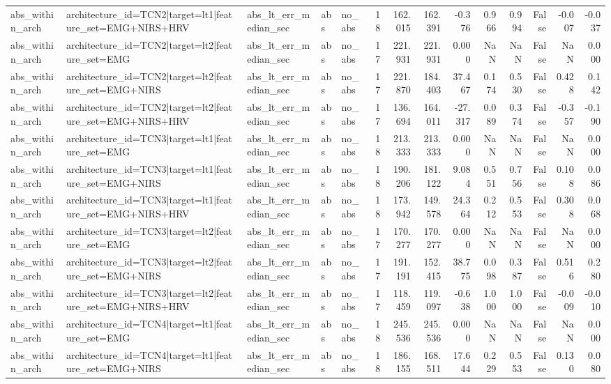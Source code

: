 \begin{table}
\begin{tabular}{lllllrrrrrrrrr}
abs_within_arch & architecture_id=TCN2|target=lt1|feature_set=EMG+NIRS+HRV & abs_lt_err_median_sec & abs & no_abs & 18 & 162.015 & 162.391 & -0.376 & 0.966 & 0.994 & False & -0.007 & -0.037 \\
abs_within_arch & architecture_id=TCN2|target=lt2|feature_set=EMG & abs_lt_err_median_sec & abs & no_abs & 17 & 221.931 & 221.931 & 0.000 & NaN & NaN & False & NaN & 0.000 \\
abs_within_arch & architecture_id=TCN2|target=lt2|feature_set=EMG+NIRS & abs_lt_err_median_sec & abs & no_abs & 17 & 221.870 & 184.403 & 37.467 & 0.174 & 0.530 & False & 0.428 & 0.142 \\
abs_within_arch & architecture_id=TCN2|target=lt2|feature_set=EMG+NIRS+HRV & abs_lt_err_median_sec & abs & no_abs & 17 & 136.694 & 164.011 & -27.317 & 0.089 & 0.374 & False & -0.357 & -0.190 \\
abs_within_arch & architecture_id=TCN3|target=lt1|feature_set=EMG & abs_lt_err_median_sec & abs & no_abs & 18 & 213.333 & 213.333 & 0.000 & NaN & NaN & False & NaN & 0.000 \\
abs_within_arch & architecture_id=TCN3|target=lt1|feature_set=EMG+NIRS & abs_lt_err_median_sec & abs & no_abs & 18 & 190.206 & 181.122 & 9.084 & 0.551 & 0.756 & False & 0.108 & 0.086 \\
abs_within_arch & architecture_id=TCN3|target=lt1|feature_set=EMG+NIRS+HRV & abs_lt_err_median_sec & abs & no_abs & 18 & 173.942 & 149.578 & 24.364 & 0.212 & 0.553 & False & 0.308 & 0.068 \\
abs_within_arch & architecture_id=TCN3|target=lt2|feature_set=EMG & abs_lt_err_median_sec & abs & no_abs & 17 & 170.277 & 170.277 & 0.000 & NaN & NaN & False & NaN & 0.000 \\
abs_within_arch & architecture_id=TCN3|target=lt2|feature_set=EMG+NIRS & abs_lt_err_median_sec & abs & no_abs & 17 & 191.191 & 152.415 & 38.775 & 0.098 & 0.387 & False & 0.516 & 0.280 \\
abs_within_arch & architecture_id=TCN3|target=lt2|feature_set=EMG+NIRS+HRV & abs_lt_err_median_sec & abs & no_abs & 17 & 118.459 & 119.097 & -0.638 & 1.000 & 1.000 & False & -0.009 & -0.010 \\
abs_within_arch & architecture_id=TCN4|target=lt1|feature_set=EMG & abs_lt_err_median_sec & abs & no_abs & 18 & 245.536 & 245.536 & 0.000 & NaN & NaN & False & NaN & 0.000 \\
abs_within_arch & architecture_id=TCN4|target=lt1|feature_set=EMG+NIRS & abs_lt_err_median_sec & abs & no_abs & 18 & 186.155 & 168.511 & 17.644 & 0.229 & 0.553 & False & 0.130 & 0.080 \\

\end{tabular}
\end{table}
